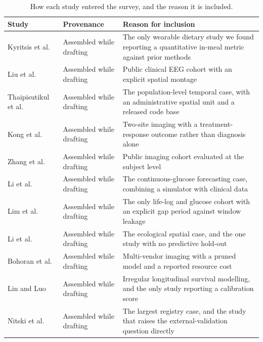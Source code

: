 \documentclass[journal]{IEEEtran}
\begin{document}
\begin{table}[tbp]
\centering
\caption{How each study entered the survey, and the reason it is included.}
\label{tab:provenance}
\footnotesize
\setlength{\tabcolsep}{4pt}
\renewcommand{\arraystretch}{1.1}
\begin{tabularx}{\textwidth}{L{2.6cm} L{3.1cm} X}
\toprule
\textbf{Study} & \textbf{Provenance} & \textbf{Reason for inclusion} \\
\midrule
Kyritsis et al.~\cite{Kyritsis2019EatingBehavior} & Assembled while drafting & The only wearable dietary study we found reporting a quantitative in-meal metric against prior methods \\
Liu et al.~\cite{2} & Assembled while drafting & Public clinical EEG cohort with an explicit spatial montage \\
Thaipisutikul et al.~\cite{3} & Assembled while drafting & The population-level temporal case, with an administrative spatial unit and a released code base \\
Kong et al.~\cite{4} & Assembled while drafting & Two-site imaging with a treatment-response outcome rather than diagnosis alone \\
Zhang et al.~\cite{9} & Assembled while drafting & Public imaging cohort evaluated at the subject level \\
Li et al.~\cite{Li2020GluNet} & Assembled while drafting & The continuous-glucose forecasting case, combining a simulator with clinical data \\
Lim et al.~\cite{Lim2025VirtualCGM} & Assembled while drafting & The only life-log and glucose cohort with an explicit gap period against window leakage \\
Li et al.~\cite{XiaoLi2016DiabetesSpatiotemporal} & Assembled while drafting & The ecological spatial case, and the one study with no predictive hold-out \\
Bohoran et al.~\cite{5} & Assembled while drafting & Multi-vendor imaging with a pruned model and a reported resource cost \\
Lin and Luo~\cite{lin2022deep} & Assembled while drafting & Irregular longitudinal survival modelling, and the only study reporting a calibration score \\
Nitski et al.~\cite{nitski2021long} & Assembled while drafting & The largest registry case, and the study that raises the external-validation question directly \\

\end{tabularx}
\end{table}
\end{document}
